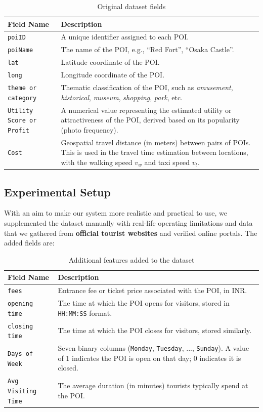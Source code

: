 \begin{table}[H]
\begin{tabularx}{0.5\textwidth}{p{3cm} X}
\hline
\textbf{Field Name} & \textbf{Description} \\
\hline
\texttt{poiID} & A unique identifier assigned to each POI. \\
\hline
\texttt{poiName} & The name of the POI, e.g., ``Red Fort'', ``Osaka Castle''. \\
\hline
\texttt{lat} & Latitude coordinate of the POI. \\
\hline
\texttt{long} & Longitude coordinate of the POI. \\
\hline
\texttt{theme or category} & Thematic classification of the POI, such as \textit{amusement}, \textit{historical}, \textit{museum}, \textit{shopping}, \textit{park}, etc. \\
\hline
\texttt{Utility Score or Profit} & A numerical value representing the estimated utility or attractiveness of the POI, derived based on its popularity (photo frequency). \\
\hline
\texttt{Cost} & Geospatial travel distance (in meters) between pairs of POIs. This is used in the travel time estimation between locations, with the walking speed $v_w$ and taxi speed $v_t$. \\
\hline
\end{tabularx}
\caption{Original dataset fields}
\end{table}

\subsection{Experimental Setup}

With an aim to make our system more realistic and practical to use, we supplemented the dataset manually with real-life operating limitations and data that we gathered from \textbf{official tourist websites} and verified online portals. The added fields are:

\begin{table}[H]
\centering
\begin{tabularx}{0.5\textwidth}{p{3cm} X}
\toprule
\textbf{Field Name} & \textbf{Description} \\
\midrule
\texttt{fees} & Entrance fee or ticket price associated with the POI, in INR. \\
\midrule
\texttt{opening time} & The time at which the POI opens for visitors, stored in \texttt{HH:MM:SS} format. \\
\midrule
\texttt{closing time} & The time at which the POI closes for visitors, stored similarly. \\
\midrule
\texttt{Days of Week} & Seven binary columns (\texttt{Monday}, \texttt{Tuesday}, ..., \texttt{Sunday}). A value of 1 indicates the POI is open on that day; 0 indicates it is closed. \\
\midrule
\texttt{Avg Visiting Time} & The average duration (in minutes) tourists typically spend at the POI. \\
\bottomrule
\end{tabularx}
\caption{Additional features added to the dataset}
\end{table}

